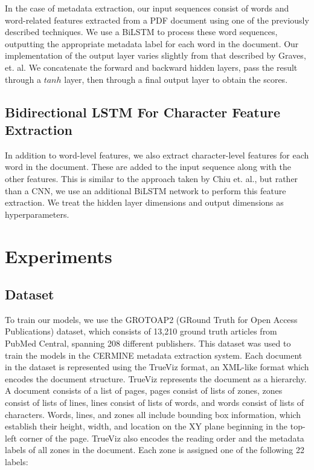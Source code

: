 \documentclass{acm_proc_article-sp}
\begin{document}
In the case of metadata extraction, our input sequences consist of words and word-related features extracted from a PDF document using one of the previously described techniques. We use a BiLSTM to process these word sequences, outputting the appropriate metadata label for each word in the document. Our implementation of the output layer varies slightly from that described by Graves, et. al. We concatenate the forward and backward hidden layers, pass the result through a $tanh$ layer, then through a final output layer to obtain the scores.

\subsection{Bidirectional LSTM For Character Feature Extraction}
In addition to word-level features, we also extract character-level features for each word in the document. These are added to the input sequence along with the other features. This is similar to the approach taken by Chiu et. al., but rather than a CNN, we use an additional BiLSTM network to perform this feature extraction. We treat the hidden layer dimensions and output dimensions as hyperparameters.

\section{Experiments}
\subsection{Dataset}
To train our models, we use the GROTOAP2 (GRound Truth for Open Access Publications) dataset, which consists of 13,210 ground truth articles from PubMed Central, spanning 208 different publishers. \cite{tkaczyk2014grotoap2} This dataset was used to train the models in the CERMINE metadata extraction system. Each document in the dataset is represented using the TrueViz format, an XML-like format which encodes the document structure. TrueViz represents the document as a hierarchy. A document consists of a list of pages, pages consist of lists of zones, zones consist of lists of lines, lines consist of lists of words, and words consist of lists of characters. Words, lines, and zones all include bounding box information, which establish their height, width, and location on the XY plane beginning in the top-left corner of the page. TrueViz also encodes the reading order and the metadata labels of all zones in the document. Each zone is assigned one of the following 22 labels:
\end{document}

